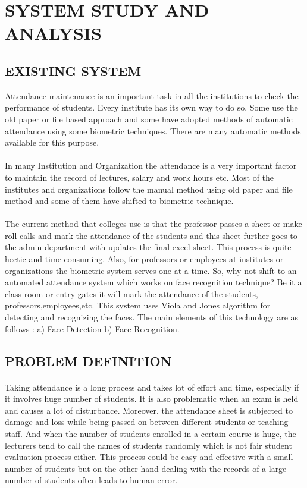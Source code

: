 \documentclass[a4paper, 12pt]{report}
\begin{document}
\section{SYSTEM STUDY AND ANALYSIS}

\subsection{EXISTING SYSTEM}
Attendance maintenance is an important task in all the institutions to check the performance of students. Every institute has its own way to do so. Some use the old paper or file based approach and some have adopted methods of automatic attendance using some biometric techniques. There are many automatic methods available for this purpose.
\paragraph{}In many Institution and Organization the attendance is a very important factor to maintain the record of lectures, salary and work hours etc. Most of the institutes and organizations follow the manual method using old paper and ﬁle method and some of them have shifted to biometric technique. \paragraph{}The current method that colleges use is that the professor passes a sheet or make roll calls and mark the attendance of the students and this sheet further goes to the admin department with updates the ﬁnal excel sheet. This process is quite hectic and time consuming. Also, for professors or employees at institutes or organizations the biometric system serves one at a time. So, why not shift to an automated attendance system which works on face recognition technique? Be it a class room or entry gates it will mark the attendance of the students, professors,employees,etc. This system uses Viola and Jones algorithm for detecting and recognizing the faces. The main elements of this technology are as follows : a) Face Detection b) Face Recognition.

\subsection{PROBLEM DEFINITION}
\paragraph{}Taking attendance is a long process and takes lot of effort and time, especially if it involves huge number of students. It is also problematic when an exam is held and causes a lot of disturbance. Moreover, the attendance sheet is subjected to damage and loss while being passed on between different students or teaching staff. And when the number of students enrolled in a certain course is huge, the lecturers tend to call the names of students randomly which is not fair student evaluation process either. This process could be easy and effective with a small number of students but on the other hand dealing with the records of a large number of students often leads to human error.
\end{document}

